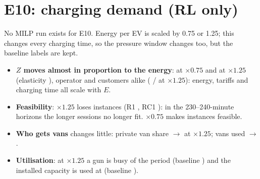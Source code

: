 \section{E10: charging demand (RL only)}\label{sec:e10}
No MILP run exists for E10. Energy per EV is scaled by 0.75 or 1.25; this changes every charging time, so the pressure window changes too, but the baseline labels are kept.





\begin{itemize}
  \item \textbf{$Z$ moves almost in proportion to the energy}: \dZEtenDemLoRt\pct{} at $\times0.75$ and \dZEtenDemHiRt\pct{} at $\times1.25$ (elasticity \ElastEnergyRl), operator and customers alike (\dOpEtenDemHiRt\pct{} / \dCuEtenDemHiRt\pct{} at $\times1.25$): energy, tariffs and charging time all scale with $E$.
  \item \textbf{Feasibility}: $\times1.25$ loses \LostEtenDemHiRt{} instances (R1 \LostFamEtenDemHiRone, RC1 \LostFamEtenDemHiRCone): in the 230--240-minute horizons the longer sessions no longer fit. $\times0.75$ makes \NewEtenDemLoRt{} instances feasible.
  \item \textbf{Who gets vans} changes little: private van share \VanPBEtenDemHiRt\pct{} $\to$ \VanPEtenDemHiRt\pct{} at $\times1.25$; vans used \VansBEtenDemHiRt{} $\to$ \VansEtenDemHiRt.
  \item \textbf{Utilisation}: at $\times1.25$ a gun is busy \UXEtenDemHiGunRt\pct{} of the period (baseline \UXBEtenDemHiGunRt\pct) and the installed capacity is used at \UXEtenDemHiSystemRt\pct{} (baseline \UXBEtenDemHiSystemRt\pct).
\end{itemize}

